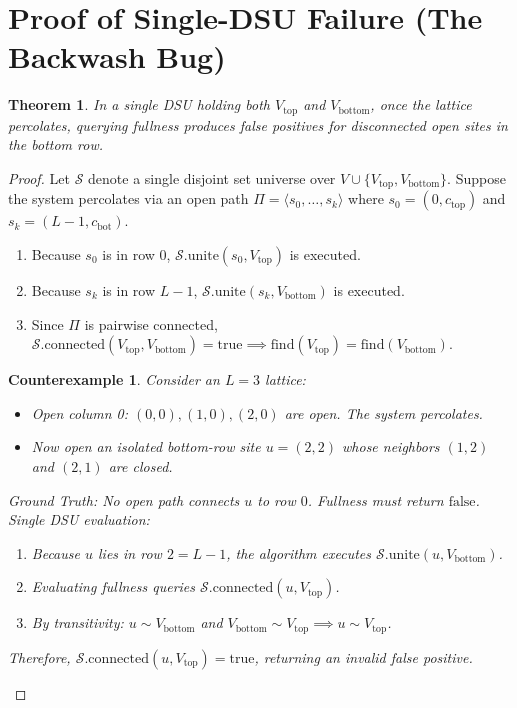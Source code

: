 \documentclass[11pt,a4paper]{article}
\newtheorem{theorem}{Theorem}
\newtheorem{counterexample}{Counterexample}
\begin{document}
\section{Proof of Single-DSU Failure (The Backwash Bug)}
\begin{theorem}
In a single DSU holding both $V_{\text{top}}$ and $V_{\text{bottom}}$, once the lattice percolates, querying fullness produces false positives for disconnected open sites in the bottom row.
\end{theorem}
\begin{proof}
Let $\mathcal{S}$ denote a single disjoint set universe over $V \cup \{V_{\text{top}}, V_{\text{bottom}}\}$.
Suppose the system percolates via an open path $\Pi = \langle s_0, \dots, s_k \rangle$ where $s_0 = (0, c_{\text{top}})$ and $s_k = (L-1, c_{\text{bot}})$.
\begin{enumerate}
    \item Because $s_0$ is in row $0$, $\mathcal{S}.\text{unite}(s_0, V_{\text{top}})$ is executed.
    \item Because $s_k$ is in row $L-1$, $\mathcal{S}.\text{unite}(s_k, V_{\text{bottom}})$ is executed.
    \item Since $\Pi$ is pairwise connected, $\mathcal{S}.\text{connected}(V_{\text{top}}, V_{\text{bottom}}) = \text{true} \implies \text{find}(V_{\text{top}}) = \text{find}(V_{\text{bottom}})$.
\end{enumerate}

\begin{counterexample}
Consider an $L=3$ lattice:
\begin{itemize}
    \item Open column 0: $(0,0), (1,0), (2,0)$ are open. The system percolates.
    \item Now open an isolated bottom-row site $u = (2, 2)$ whose neighbors $(1,2)$ and $(2,1)$ are closed.
\end{itemize}
Ground Truth: No open path connects $u$ to row $0$. Fullness must return $\text{false}$.\\
Single DSU evaluation:
\begin{enumerate}
    \item Because $u$ lies in row $2 = L-1$, the algorithm executes $\mathcal{S}.\text{unite}(u, V_{\text{bottom}})$.
    \item Evaluating fullness queries $\mathcal{S}.\text{connected}(u, V_{\text{top}})$.
    \item By transitivity: $u \sim V_{\text{bottom}}$ and $V_{\text{bottom}} \sim V_{\text{top}} \implies u \sim V_{\text{top}}$.
\end{enumerate}
Therefore, $\mathcal{S}.\text{connected}(u, V_{\text{top}}) = \text{true}$, returning an invalid false positive.
\end{counterexample}
\end{proof}
\end{document}
